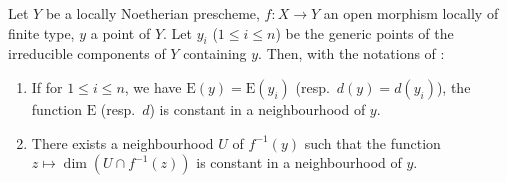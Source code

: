 \begin{corollary}[14.2.6]
\label{IV.14.2.6}
Let $Y$ be a locally Noetherian prescheme, $f:X\to Y$ an open morphism locally of finite type, $y$ a point of $Y$.
Let $y_i$ ($1\leq i\leq n$) be the generic points of the irreducible components of $Y$ containing $y$.
Then, with the notations of :
\begin{enumerate}[label=(\roman*)]
  \item If for $1\leq i\leq n$, we have $\mathrm{E}(y)=\mathrm{E}(y_i)$ (resp.\ $d(y)=d(y_i)$), the function $\mathrm{E}$ (resp.\ $d$) is constant in a neighbourhood of $y$.
  \item There exists a neighbourhood $U$ of $f^{-1}(y)$ such that the function $z\mapsto\dim(U\cap f^{-1}(z))$ is constant in a neighbourhood of $y$.
\end{enumerate}
\end{corollary}

